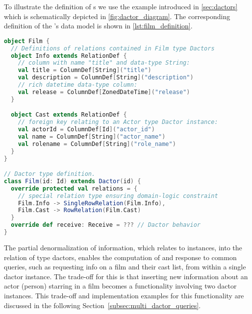To illustrate the definition of s we use the example introduced in \cref{sec:dactors} which is schematically depicted in \cref{fig:dactor_diagram}.
The corresponding definition of the 's data model is shown in \cref{lst:film_definition}.

\begin{minipage}{1.0\linewidth}
\begin{lstlisting}[caption=Film Dactor type definition using the presented framework., label=lst:film_definition, language=Scala]
object Film {
  // Definitions of relations contained in Film type Dactors
  object Info extends RelationDef {
    // column with name "title" and data-type String:
    val title = ColumnDef[String]("title")
    val description = ColumnDef[String]("description")
    // rich datetime data-type column:
    val release = ColumnDef[ZonedDateTime]("release")
  }

  object Cast extends RelationDef {
    // foreign key relating to an Actor type Dactor instance:
    val actorId = ColumnDef[Id]("actor_id")
    val name = ColumnDef[String]("actor_name")
    val rolename = ColumnDef[String]("role_name")
  }
} 

// Dactor type definition.
class Film(id: Id) extends Dactor(id) {
  override protected val relations = {
    // special relation type ensuring domain-logic constraint
    Film.Info -> SingleRowRelation(Film.Info),
    Film.Cast -> RowRelation(Film.Cast)
  }
  override def receive: Receive = ??? // Dactor behavior
}
\end{lstlisting}
\end{minipage}
%


The partial denormalization of information, which relates to  instances, into the  \gls{relation} of  type \glspl{dactor},
enables the computation of and response to common queries, such as requesting info on a film and their cast list, from within a single \gls{dactor} instance.
The trade-off for this is that inserting new information about an actor (person) starring in a film becomes a functionality involving two \gls{dactor} instances.
This trade-off and implementation examples for this functionality are discussed in the following Section~\ref{subsec:multi_dactor_queries}.

